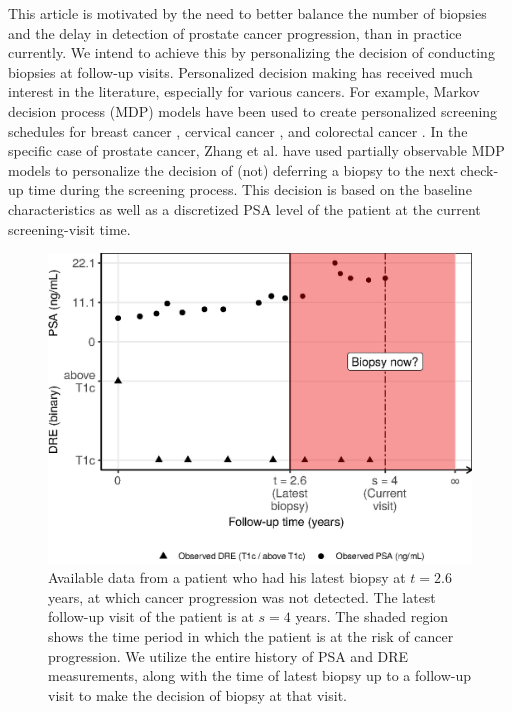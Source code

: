 This article is motivated by the need to better balance the number of biopsies and the delay in detection of prostate cancer progression, than in practice currently. We intend to achieve this by personalizing the decision of conducting biopsies at follow-up visits. Personalized decision making has received much interest in the literature, especially for various cancers. For example, Markov decision process (MDP) models have been used to create personalized screening schedules for breast cancer \cite{ayer2012or}, cervical cancer \cite{akhavan2017markov}, and colorectal cancer \cite{erenay2014optimizing}. In the specific case of prostate cancer, Zhang et al. \cite{zhang2012optimization} have used partially observable MDP models to personalize the decision of (not) deferring a biopsy to the next check‐up time during the screening process. This decision is based on the baseline characteristics as well as a discretized PSA level of the patient at the current screening-visit time.
\begin{figure}[!htb]
\captionsetup{justification=justified}
\centerline{\includegraphics[width=\columnwidth]{images/obsDataPlot_2340.eps}}
\caption{Available data from a patient who had his latest biopsy at $t=2.6$ years, at which cancer progression was not detected. The latest follow-up visit of the patient is at $s=4$ years. The shaded region shows the time period in which the patient is at the risk of cancer progression. We utilize the entire history of PSA and DRE measurements, along with the time of latest biopsy up to a follow-up visit to make the decision of biopsy at that visit.}
\label{fig:obsDataPlot_2340}
\end{figure}

